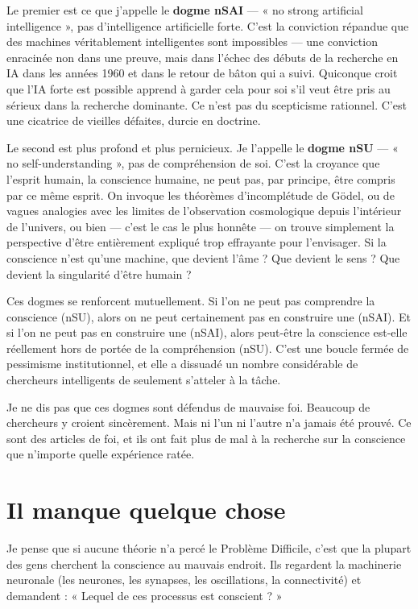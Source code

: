 \documentclass[11pt, twoside, openright]{book}
\begin{document}
Le premier est ce que j'appelle le \textbf{dogme nSAI} --- « no strong artificial intelligence », pas d'intelligence artificielle forte. C'est la conviction répandue que des machines véritablement intelligentes sont impossibles --- une conviction enracinée non dans une preuve, mais dans l'échec des débuts de la recherche en IA dans les années 1960 et dans le retour de bâton qui a suivi. Quiconque croit que l'IA forte est possible apprend à garder cela pour soi s'il veut être pris au sérieux dans la recherche dominante. Ce n'est pas du scepticisme rationnel. C'est une cicatrice de vieilles défaites, durcie en doctrine.

Le second est plus profond et plus pernicieux. Je l'appelle le \textbf{dogme nSU} --- « no self-understanding », pas de compréhension de soi. C'est la croyance que l'esprit humain, la conscience humaine, ne peut pas, par principe, être compris par ce même esprit. On invoque les théorèmes d'incomplétude de Gödel, ou de vagues analogies avec les limites de l'observation cosmologique depuis l'intérieur de l'univers, ou bien --- c'est le cas le plus honnête --- on trouve simplement la perspective d'être entièrement expliqué trop effrayante pour l'envisager. Si la conscience n'est qu'une machine, que devient l'âme ? Que devient le sens ? Que devient la singularité d'être humain ?

Ces dogmes se renforcent mutuellement. Si l'on ne peut pas comprendre la conscience (nSU), alors on ne peut certainement pas en construire une (nSAI). Et si l'on ne peut pas en construire une (nSAI), alors peut-être la conscience est-elle réellement hors de portée de la compréhension (nSU). C'est une boucle fermée de pessimisme institutionnel, et elle a dissuadé un nombre considérable de chercheurs intelligents de seulement s'atteler à la tâche.

Je ne dis pas que ces dogmes sont défendus de mauvaise foi. Beaucoup de chercheurs y croient sincèrement. Mais ni l'un ni l'autre n'a jamais été prouvé. Ce sont des articles de foi, et ils ont fait plus de mal à la recherche sur la conscience que n'importe quelle expérience ratée.

\section*{Il manque quelque chose}

Je pense que si aucune théorie n'a percé le Problème Difficile, c'est que la plupart des gens cherchent la conscience au mauvais endroit. Ils regardent la machinerie neuronale (les neurones, les synapses, les oscillations, la connectivité) et demandent : « Lequel de ces processus est conscient ? »
\end{document}
